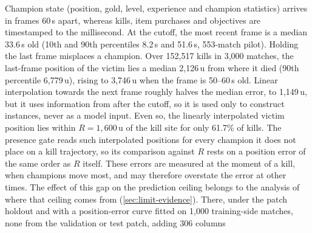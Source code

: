 Champion state (position, gold, level, experience and champion statistics) arrives in frames 60\,s
apart, whereas kills, item purchases and objectives are timestamped to the millisecond.
At the cutoff, the most recent frame is a median 33.6\,s old (10th and 90th percentiles 8.2\,s
and 51.6\,s, 553-match pilot).
Holding the last frame misplaces a champion. Over 152,517 kills in 3,000 matches, the last-frame
position of the victim lies a median 2,126\,u from where it died (90th percentile 6,779\,u),
rising to 3,746\,u when the frame is 50--60\,s old.
Linear interpolation towards the next frame roughly halves the median error, to 1,149\,u, but it
uses information from after the cutoff, so it is used only to construct instances, never as a
model input. Even so, the linearly interpolated victim position lies within $R = 1{,}600$\,u of the
kill site for only 61.7\% of kills. The presence gate reads such interpolated positions for every
champion it does not place on a kill trajectory, so its comparison against $R$ rests on a position
error of the same order as $R$ itself. These errors are measured at the moment of a kill, when
champions move most, and may therefore overstate the error at other times.
The effect of this gap on the prediction ceiling belongs to the analysis of where that ceiling
comes from (\cref{sec:limit-evidence}). There, under the patch holdout and with a position-error curve
fitted on 1,000 training-side matches, none from the validation or test patch, adding 306 columns
